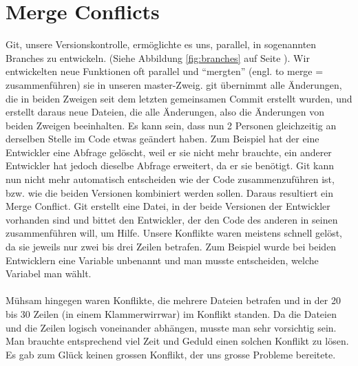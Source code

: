 \documentclass[11pt,a4paper]{scrbook}
\newcommand{\q}[1]{``#1''}
\begin{document}
\section{Merge Conflicts}
Git, unsere Versionskontrolle, ermöglichte es uns, parallel, in sogenannten Branches zu entwickeln. (Siehe Abbildung \ref{fig:branches} auf Seite \pageref{fig:branches}). Wir entwickelten neue Funktionen oft parallel und \q{mergten} (engl. to merge = zusammenführen) sie in unseren master-Zweig.
git übernimmt alle Änderungen, die in beiden Zweigen seit dem letzten gemeinsamen Commit erstellt wurden, und erstellt daraus neue Dateien, die alle Änderungen,
also die Änderungen von beiden Zweigen beeinhalten. Es kann sein, dass nun 2 Personen gleichzeitig an derselben Stelle im Code etwas geändert haben. Zum Beispiel
hat der eine Entwickler eine Abfrage gelöscht, weil er sie nicht mehr brauchte, ein anderer Entwickler hat jedoch dieselbe Abfrage erweitert, da er sie benötigt.
Git kann nun nicht mehr automatisch entscheiden wie der Code zusammenzuführen ist, bzw. wie die beiden Versionen kombiniert werden sollen. Daraus resultiert ein Merge
Conflict. Git erstellt eine Datei, in der beide Versionen der Entwickler vorhanden sind und bittet den Entwickler, der den Code des anderen in seinen zusammenführen
will, um Hilfe. Unsere Konflikte waren meistens schnell gelöst, da sie jeweils nur zwei bis drei Zeilen betrafen. Zum Beispiel wurde bei beiden Entwicklern
eine Variable unbenannt und man musste entscheiden, welche Variabel man wählt.\\
\\
Mühsam hingegen waren Konflikte, die mehrere Dateien betrafen und in der 20 bis 30 Zeilen (in einem Klammerwirrwar) im Konflikt standen. Da die Dateien und die Zeilen
logisch voneinander abhängen, musste man sehr vorsichtig sein. Man brauchte entsprechend viel Zeit und Geduld einen solchen Konflikt zu lösen. Es gab zum Glück keinen
grossen Konflikt, der uns grosse Probleme bereitete.
\end{document}
